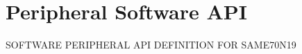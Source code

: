 \hypertarget{group__SAME70N19__api}{}\section{Peripheral Software A\+PI}
\label{group__SAME70N19__api}
S\+O\+F\+T\+W\+A\+RE P\+E\+R\+I\+P\+H\+E\+R\+AL A\+PI D\+E\+F\+I\+N\+I\+T\+I\+ON F\+OR S\+A\+M\+E70\+N19 